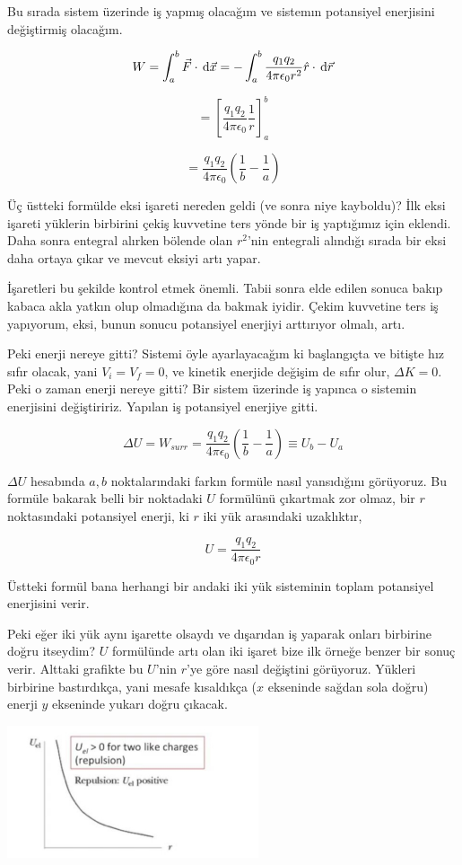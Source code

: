 \documentclass[12pt,fleqn]{article}\usepackage{../../common}
\begin{document}
Bu sırada sistem üzerinde iş yapmış olacağım ve sistemın potansiyel enerjisini
değiştirmiş olacağım.

$$
W = \int_{a}^{b} \vec{F} \cdot \,\mathrm{d} \vec{x} =
-\int_{a}^{b} \frac{q_1 q_2}{4 \pi \epsilon_0 r^2} \hat{r} \cdot \,\mathrm{d} \vec{r}
$$

$$
= \left[ \frac{q_1 q_2}{4 \pi \epsilon_0} \frac{1}{r} \right]_{a}^{b} 
$$

$$
= \frac{q_1 q_2}{4 \pi \epsilon_0} (\frac{1}{b} - \frac{1}{a})
$$  

Üç üstteki formülde eksi işareti nereden geldi (ve sonra niye kayboldu)? İlk
eksi işareti yüklerin birbirini çekiş kuvvetine ters yönde bir iş yaptığımız
için eklendi. Daha sonra entegral alırken bölende olan $r^2$'nin entegrali
alındığı sırada bir eksi daha ortaya çıkar ve mevcut eksiyi artı yapar.

İşaretleri bu şekilde kontrol etmek önemli. Tabii sonra elde edilen sonuca bakıp
kabaca akla yatkın olup olmadığına da bakmak iyidir. Çekim kuvvetine ters iş
yapıyorum, eksi, bunun sonucu potansiyel enerjiyi arttırıyor olmalı, artı.

Peki enerji nereye gitti? Sistemi öyle ayarlayacağım ki başlangıçta ve bitişte
hız sıfır olacak, yani $V_i=V_f=0$, ve kinetik enerjide değişim de sıfır olur,
$\Delta K = 0$. Peki o zaman enerji nereye gitti? Bir sistem üzerinde iş yapınca
o sistemin enerjisini değiştiririz. Yapılan iş potansiyel enerjiye gitti. 

$$
\Delta U = W_{surr} =
\frac{q_1 q_2}{4 \pi \epsilon_0} \left( \frac{1}{b} - \frac{1}{a} \right) \equiv 
U_b - U_a
$$

$\Delta U$ hesabında $a,b$ noktalarındaki farkın formüle nasıl yansıdığını
görüyoruz. Bu formüle bakarak belli bir noktadaki $U$ formülünü çıkartmak zor
olmaz, bir $r$ noktasındaki potansiyel enerji, ki $r$ iki yük arasındaki
uzaklıktır,

$$
U = \frac{q_1 q_2}{4 \pi \epsilon_0 r}
$$

Üstteki formül bana herhangi bir andaki iki yük sisteminin toplam potansiyel
enerjisini verir.

Peki eğer iki yük aynı işarette olsaydı ve dışarıdan iş yaparak onları birbirine
doğru itseydim? $U$ formülünde artı olan iki işaret bize ilk örneğe benzer bir
sonuç verir. Alttaki grafikte bu $U$'nin $r$'ye göre nasıl değiştini
görüyoruz. Yükleri birbirine bastırdıkça, yani mesafe kısaldıkça ($x$ ekseninde
sağdan sola doğru) enerji $y$ ekseninde yukarı doğru çıkacak.

\includegraphics[width=20em]{08_05.jpg}
\end{document}
